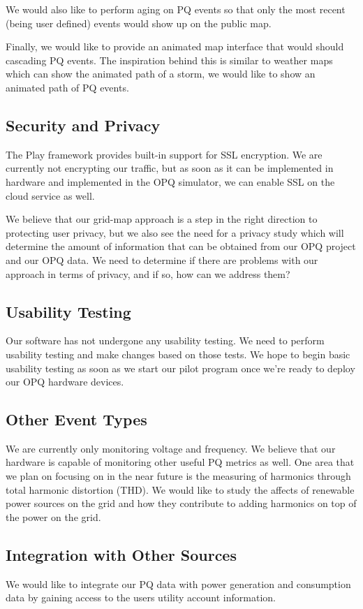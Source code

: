 \documentclass[11pt]{article}
\begin{document}
We would also like to perform aging on PQ events so that only the most recent (being user defined) events would show up on the public map. 

Finally, we would like to provide an animated map interface that would should cascading PQ events. The inspiration behind this is similar to weather maps which can show the animated path of a storm, we would like to show an animated path of PQ events. 

\subsection{Security and Privacy}
The Play framework provides built-in support for SSL encryption. We are currently not encrypting our traffic, but as soon as it can be implemented in hardware and implemented in the OPQ simulator, we can enable SSL on the cloud service as well.

We believe that our grid-map approach is a step in the right direction to protecting user privacy, but we also see the need for a privacy study which will determine the amount of information that can be obtained from our OPQ project and our OPQ data. We need to determine if there are problems with our approach in terms of privacy, and if so, how can we address them?

\subsection{Usability Testing}
Our software has not undergone any usability testing. We need to perform usability testing and make changes based on those tests. We hope to begin basic usability testing as soon as we start our pilot program once we're ready to deploy our OPQ hardware devices.

\subsection{Other Event Types}
We are currently only monitoring voltage and frequency. We believe that our hardware is capable of monitoring other useful PQ metrics as well. One area that we plan on focusing on in the near future is the measuring of harmonics through total harmonic distortion (THD). We would like to study the affects of renewable power sources on the grid and how they contribute to adding harmonics on top of the power on the grid.

\subsection{Integration with Other Sources}
We would like to integrate our PQ data with power generation and consumption data by gaining access to the users utility account information.
\end{document}
